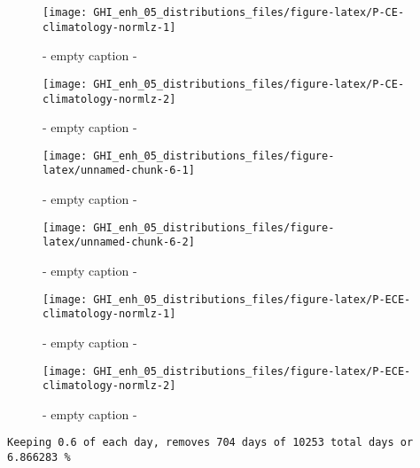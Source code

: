 \documentclass[
  10pt,
  a4paper,oneside]{article}
\begin{document}
\begin{figure}[H]

{\centering \texttt{[image: GHI\_enh\_05\_distributions\_files/figure-latex/P-CE-climatology-normlz-1]} 

}

\caption{ - empty caption - }\label{fig:P-CE-climatology-normlz-1}
\end{figure}
\begin{figure}[H]

{\centering \texttt{[image: GHI\_enh\_05\_distributions\_files/figure-latex/P-CE-climatology-normlz-2]} 

}

\caption{ - empty caption - }\label{fig:P-CE-climatology-normlz-2}
\end{figure}
\begin{figure}[H]

{\centering \texttt{[image: GHI\_enh\_05\_distributions\_files/figure-latex/unnamed-chunk-6-1]} 

}

\caption{ - empty caption - }\label{fig:unnamed-chunk-6-1}
\end{figure}
\begin{figure}[H]

{\centering \texttt{[image: GHI\_enh\_05\_distributions\_files/figure-latex/unnamed-chunk-6-2]} 

}

\caption{ - empty caption - }\label{fig:unnamed-chunk-6-2}
\end{figure}
\begin{figure}[H]

{\centering \texttt{[image: GHI\_enh\_05\_distributions\_files/figure-latex/P-ECE-climatology-normlz-1]} 

}

\caption{ - empty caption - }\label{fig:P-ECE-climatology-normlz-1}
\end{figure}
\begin{figure}[H]

{\centering \texttt{[image: GHI\_enh\_05\_distributions\_files/figure-latex/P-ECE-climatology-normlz-2]} 

}

\caption{ - empty caption - }\label{fig:P-ECE-climatology-normlz-2}
\end{figure}

\begin{verbatim}
Keeping 0.6 of each day, removes 704 days of 10253 total days or 6.866283 %
\end{verbatim}
\end{document}

